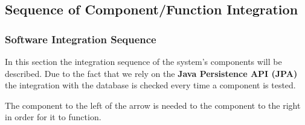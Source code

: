 \subsection{Sequence of Component/Function Integration}

\subsubsection{Software Integration Sequence}
In this section the integration sequence of the system's components will be
described. Due to the fact that we rely on the
\textbf{Java Persistence API (JPA)} the integration with the database is
checked every time a component is tested.

The component to the left of the arrow is needed to the component to the right
in order for it to function.


